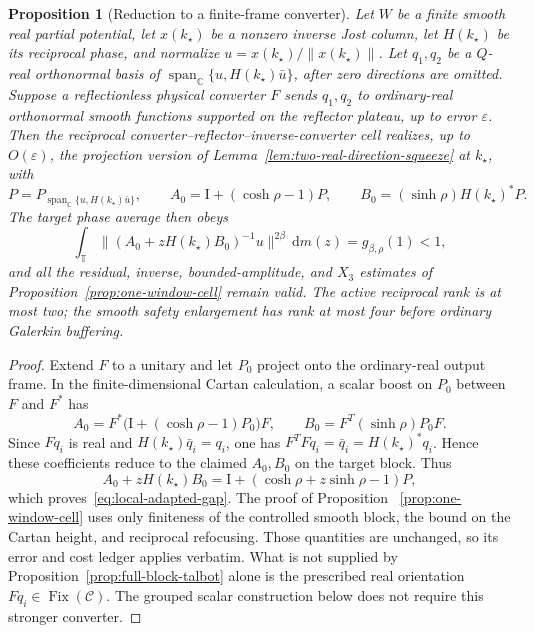 \documentclass[11pt]{article}
\newtheorem{proposition}[theorem]{Proposition}
\theoremstyle{remark}
\newcommand{\C}{\mathbb C}
\newcommand{\T}{\mathbb T}
\newcommand{\Id}{\mathrm I}
\newcommand{\dd}{\,\mathrm d}
\begin{document}
\begin{proposition}[Reduction to a finite-frame converter]
\label{prop:local-adapted-squeeze}
Let $W$ be a finite smooth real partial potential, let $x(k_\star)$ be a
nonzero inverse Jost column, let $H(k_\star)$ be its reciprocal phase, and
normalize $u=x(k_\star)/\|x(k_\star)\|$.
Let $q_1,q_2$ be a $Q$-real orthonormal basis of
$\operatorname{span}_{\C}\{u,H(k_\star)\bar u\}$, after zero directions are
omitted.  Suppose a reflectionless physical converter $F$ sends $q_1,q_2$ to
ordinary-real orthonormal smooth functions supported on the reflector
plateau, up to error $\varepsilon$.  Then the reciprocal
converter--reflector--inverse-converter cell realizes, up to
$O(\varepsilon)$, the projection version of
Lemma~\ref{lem:two-real-direction-squeeze} at $k_\star$, with
\[
 P=P_{\operatorname{span}_{\C}\{u,H(k_\star)\bar u\}},\qquad
 A_0=\Id+(\cosh\rho-1)P,\qquad
 B_0=(\sinh\rho)H(k_\star)^*P.
\]
The target phase average then obeys
\begin{equation}
 \int_\T\|(A_0+zH(k_\star)B_0)^{-1}u\|^{2\beta}\dd m(z)
 =g_{\beta,\rho}(1)<1,
 \label{eq:local-adapted-gap}
\end{equation}
and all the residual, inverse, bounded-amplitude, and $X_3$ estimates of
Proposition~\ref{prop:one-window-cell} remain valid.  The active reciprocal
rank is at most two; the smooth safety enlargement has rank at most four
before ordinary Galerkin buffering.
\end{proposition}

\begin{proof}
Extend $F$ to a unitary and let $P_0$ project onto the ordinary-real output
frame.  In the finite-dimensional Cartan calculation, a scalar boost on
$P_0$ between $F$ and $F^*$ has
\[
 A_0=F^*\bigl(\Id+(\cosh\rho-1)P_0\bigr)F,
 \qquad
 B_0=F^T(\sinh\rho)P_0F.
\]
Since $Fq_i$ is real and $H(k_\star)\bar q_i=q_i$, one has
$F^TFq_i=\bar q_i=H(k_\star)^*q_i$.  Hence these coefficients reduce to the
claimed $A_0,B_0$ on the target block.  Thus
\[
 A_0+zH(k_\star)B_0=\Id+(\cosh\rho+z\sinh\rho-1)P,
\]
which proves~\eqref{eq:local-adapted-gap}.  The proof of Proposition
~\ref{prop:one-window-cell} uses only finiteness of the controlled smooth
block, the bound on the Cartan height, and reciprocal refocusing.  Those
quantities are unchanged, so its error and cost ledger applies verbatim.
What is not supplied by Proposition~\ref{prop:full-block-talbot} alone is the
 prescribed real orientation $Fq_i\in\operatorname{Fix}(\mathcal C)$.  The
 grouped scalar construction below does not require this stronger converter.
\end{proof}
\end{document}

